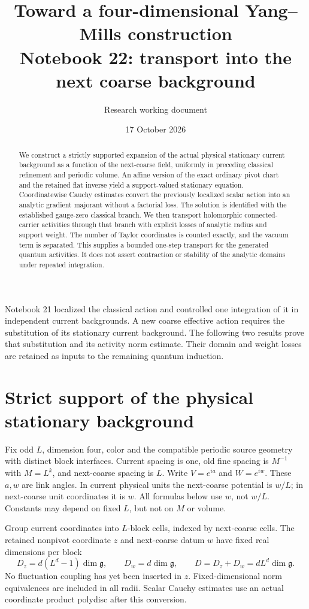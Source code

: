 \documentclass[11pt]{article}
\title{Toward a four-dimensional Yang--Mills construction\\
\large Notebook 22: transport into the next coarse background}
\author{Research working document}
\date{17 October 2026}
\theoremstyle{remark}
\begin{document}
\maketitle
\begin{abstract}
We construct a strictly supported expansion of the actual physical
stationary current background as a function of the next-coarse
field, uniformly in preceding classical refinement and periodic
volume. An affine version of the exact ordinary pivot chart and
the retained flat inverse yield a support-valued stationary
equation. Coordinatewise Cauchy estimates convert the previously
localized scalar action into an analytic gradient majorant without
a factorial loss. The solution is identified with the established
gauge-zero classical branch. We then transport holomorphic
connected-carrier activities through that branch with explicit
losses of analytic radius and support weight. The number of
Taylor coordinates is counted exactly, and the vacuum term is
separated. This supplies a bounded one-step transport for the
generated quantum activities. It does not assert contraction
or stability of the analytic domains under repeated integration.
\end{abstract}

Notebook 21 localized the classical action and controlled one
integration of it in independent current backgrounds. A new
coarse effective action requires the substitution of its
stationary current background. The following two results prove
that substitution and its activity norm estimate. Their domain
and weight losses are retained as inputs to the remaining
quantum induction.


\section{Strict support of the physical stationary background}
\label{st-section}

Fix odd $L$, dimension four, color and the compatible periodic source
geometry with distinct block interfaces. Current spacing is one, old
fine spacing is $M^{-1}$ with $M=L^k$, and next-coarse spacing is $L$.
Write $V=e^{ia}$ and $W=e^{iw}$. These $a,w$ are link angles. In current
physical units the next-coarse potential is $w/L$; in next-coarse unit
coordinates it is $w$. All formulas below use $w$, not $w/L$.
Constants may depend on fixed $L$, but not on $M$ or volume.

Group current coordinates into $L$-block cells, indexed by next-coarse
cells. The retained nonpivot coordinate $z$ and next-coarse datum $w$
have fixed real dimensions per block
\begin{equation}
 D_z=d(L^d-1)\dim\mathfrak g,\qquad D_w=d\dim\mathfrak g,
 \qquad D=D_z+D_w=dL^d\dim\mathfrak g.                         \label{st-dimensions}
\end{equation}
No fluctuation coupling has yet been inserted in $z$. Fixed-dimensional
norm equivalences are included in all radii. Scalar Cauchy estimates use
an actual coordinate product polydisc after this conversion.
\end{document}
